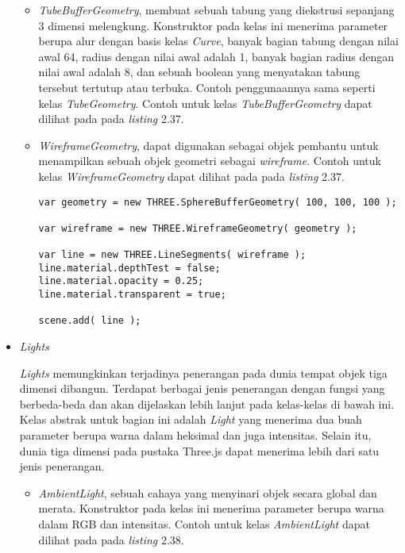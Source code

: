 \begin{itemize}
\begin{itemize}
	\item {\it TubeBufferGeometry},  membuat sebuah tabung yang diekstrusi sepanjang 3 dimensi melengkung. Konstruktor pada kelas ini menerima parameter berupa alur dengan basis kelas {\it Curve}, banyak bagian tabung dengan nilai awal 64, radius dengan nilai awal adalah 1, banyak bagian radius dengan nilai awal adalah 8, dan sebuah boolean yang menyatakan tabung tersebut tertutup atau terbuka. Contoh penggunaannya sama seperti kelas {\it TubeGeometry}. Contoh untuk kelas {\it TubeBufferGeometry} dapat dilihat pada pada {\it listing} 2.37.
	
	\item {\it WireframeGeometry}, dapat digunakan sebagai objek pembantu untuk menampilkan sebuah objek geometri sebagai {\it wireframe}. Contoh untuk kelas {\it WireframeGeometry} dapat dilihat pada pada {\it listing} 2.37.
	
\begin{lstlisting}[caption={Contoh penggunaan kelas {\it WireframeGeometry}.},captionpos=b]
var geometry = new THREE.SphereBufferGeometry( 100, 100, 100 );

var wireframe = new THREE.WireframeGeometry( geometry );

var line = new THREE.LineSegments( wireframe );
line.material.depthTest = false;
line.material.opacity = 0.25;
line.material.transparent = true;

scene.add( line );
\end{lstlisting}

	\end{itemize}
	
\item \textit{Lights}

{\it Lights} memungkinkan terjadinya penerangan pada dunia tempat objek tiga dimensi dibangun. Terdapat berbagai jenis penerangan dengan fungsi yang berbeda-beda dan akan dijelaskan lebih lanjut pada kelas-kelas di bawah ini. Kelas abstrak untuk bagian ini adalah {\it Light} yang menerima dua buah parameter berupa warna dalam heksimal dan juga intensitas. Selain itu, dunia tiga dimensi pada pustaka Three.js dapat menerima lebih dari satu jenis penerangan.
	\begin{itemize}
	\item {\it AmbientLight}, sebuah cahaya yang menyinari objek secara global dan merata. Konstruktor pada kelas ini menerima parameter berupa warna dalam RGB dan intensitas. Contoh untuk kelas {\it AmbientLight} dapat dilihat pada pada {\it listing} 2.38.
	

\end{itemize}
\end{itemize}
